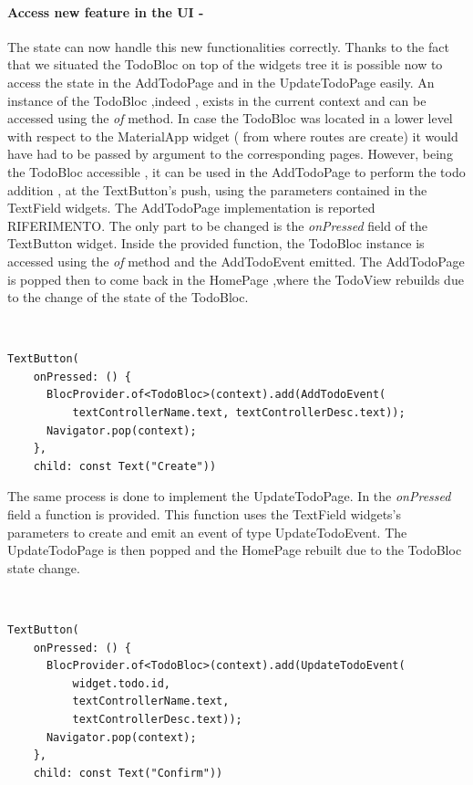 \paragraph{Access new feature in the UI - }\label{subpar:todo_app_bloc_core_state}

The state can now handle this new functionalities correctly. Thanks to the fact that we situated the TodoBloc on top of the widgets tree it is possible now to access the state in the AddTodoPage and in the UpdateTodoPage easily. An instance of the TodoBloc ,indeed , exists in the current context and can be accessed using the \textit{of} method. In case the TodoBloc was located in a lower level with respect to the MaterialApp widget ( from where routes are create)  it would have had to be passed by argument to the corresponding pages. However, being the TodoBloc accessible , it can be used in the AddTodoPage to perform the todo addition , at the TextButton’s push, using the parameters contained in the TextField widgets. The AddTodoPage implementation is reported RIFERIMENTO. The only part to be changed is the \textit{onPressed} field of the TextButton widget. Inside the provided function, the TodoBloc instance is accessed using the \textit{of} method and the AddTodoEvent emitted. The AddTodoPage is popped then to come back in the HomePage ,where the TodoView rebuilds due to the change of the state of the TodoBloc.
\begin{code}
\mbox{}\\
 \mbox{}
\label{code:2.14}
\begin{verbatim}
TextButton(
    onPressed: () {
      BlocProvider.of<TodoBloc>(context).add(AddTodoEvent(
          textControllerName.text, textControllerDesc.text));
      Navigator.pop(context);
    },
    child: const Text("Create"))
\end{verbatim}
\mbox{}
\end{code}

The same process is done to implement the UpdateTodoPage. In the \textit{onPressed} field a function is provided. This function uses the TextField widgets’s parameters to create and emit an event of type UpdateTodoEvent. The UpdateTodoPage is then popped and the HomePage rebuilt due to the TodoBloc state change.
\begin{code}
\mbox{}\\
 \mbox{}
\label{code:2.14}
\begin{verbatim}
TextButton(
    onPressed: () {
      BlocProvider.of<TodoBloc>(context).add(UpdateTodoEvent(
          widget.todo.id,
          textControllerName.text,
          textControllerDesc.text));
      Navigator.pop(context);
    },
    child: const Text("Confirm"))
\end{verbatim}
\mbox{}
\end{code}

